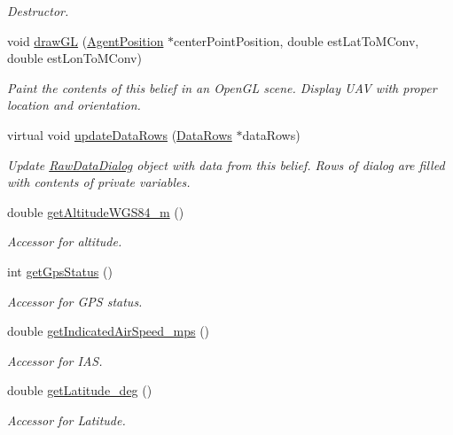 \begin{DoxyCompactItemize}
\begin{DoxyCompactList}\small\item\em Destructor. \end{DoxyCompactList}\item 
void \hyperlink{class_piccolo_telemetry_belief_af5fbaed4222906597b078eb5e97b35a4}{drawGL} (\hyperlink{class_agent_position}{AgentPosition} $\ast$centerPointPosition, double estLatToMConv, double estLonToMConv)
\begin{DoxyCompactList}\small\item\em Paint the contents of this belief in an OpenGL scene. Display UAV with proper location and orientation. \end{DoxyCompactList}\item 
virtual void \hyperlink{class_piccolo_telemetry_belief_a64a65f46bda72414e6d1760e4117d519}{updateDataRows} (\hyperlink{struct_data_rows}{DataRows} $\ast$dataRows)
\begin{DoxyCompactList}\small\item\em Update \hyperlink{class_raw_data_dialog}{RawDataDialog} object with data from this belief. Rows of dialog are filled with contents of private variables. \end{DoxyCompactList}\item 
double \hyperlink{class_piccolo_telemetry_belief_aae70dc510f5c142ac38ab3dcaf4d3e55}{getAltitudeWGS84\_\-m} ()
\begin{DoxyCompactList}\small\item\em Accessor for altitude. \end{DoxyCompactList}\item 
int \hyperlink{class_piccolo_telemetry_belief_ae924a7ddcff81067fc1f9f1e8c68256f}{getGpsStatus} ()
\begin{DoxyCompactList}\small\item\em Accessor for GPS status. \end{DoxyCompactList}\item 
double \hyperlink{class_piccolo_telemetry_belief_a0fa33080238205cfdc2cb28c29e7bf86}{getIndicatedAirSpeed\_\-mps} ()
\begin{DoxyCompactList}\small\item\em Accessor for IAS. \end{DoxyCompactList}\item 
double \hyperlink{class_piccolo_telemetry_belief_aa548d5394d3348f6990b603a3875eab3}{getLatitude\_\-deg} ()
\begin{DoxyCompactList}\small\item\em Accessor for Latitude. \end{DoxyCompactList}\item 

\end{DoxyCompactItemize}

